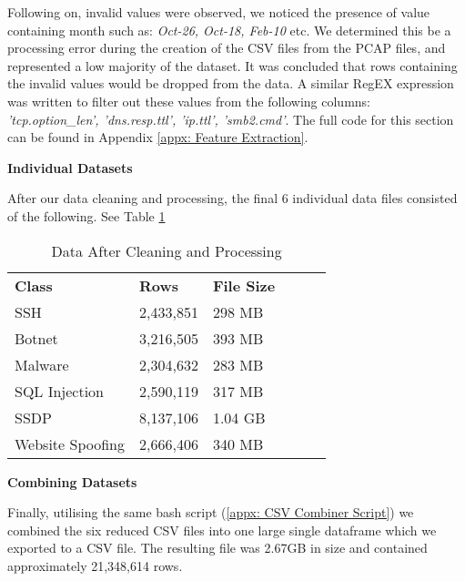 \smallskip
Following on, invalid values were observed, we noticed the presence of value containing month such as: \textit{Oct-26, Oct-18, Feb-10} etc. We determined this be a processing error during the creation of the CSV files from the PCAP files, and represented a low majority of the dataset. It was concluded that rows containing the invalid values would be dropped from the data. A similar RegEX expression was written to filter out these values from the following columns: \textit{'tcp.option\_len', 'dns.resp.ttl', 'ip.ttl', 'smb2.cmd'}. The full code for this section can be found in Appendix \ref{appx: Feature Extraction}.

\medskip

\textbf{Individual Datasets}

\smallskip
After our data cleaning and processing, the final 6 individual data files consisted of the following. See Table \ref{tab:reduced_data}

\begin{table}[H]
\centering
\begin{tabular}{llllll}
\cline{1-3}
\textbf{Class}  & \textbf{Rows} & \textbf{File Size} &  &  &  \\ \cline{1-3}
SSH              & 2,433,851    & 298 MB               &  &  &  \\
Botnet           & 3,216,505     & 393 MB             &  &  &  \\
Malware          & 2,304,632     & 283 MB             &  &  &  \\
SQL Injection    & 2,590,119     & 317 MB             &  &  &  \\
SSDP             & 8,137,106     & 1.04 GB            &  &  &  \\
Website Spoofing & 2,666,406     & 340 MB            &  &  &  \\ \cline{1-3}
\end{tabular}
\caption{Data After Cleaning and Processing}
\label{tab:reduced_data}
\end{table}

\medskip

\textbf{Combining Datasets}

\smallskip
Finally, utilising the same bash script (\ref{appx: CSV Combiner Script}) we combined the six reduced CSV files into one large single dataframe which we exported to a CSV file. The resulting file was 2.67GB in size and contained approximately 21,348,614 rows. 